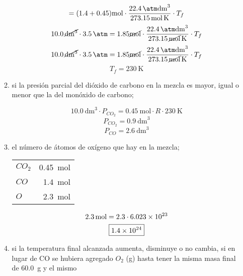 \documentclass[../Práctica.root.tex]{subfiles}
\begin{document}
\begin{enumerate}
\begin{enumerate}
\begin{center}
\[                            = (\num{1,4} + \num{0,45})\si{\mole}
                            \cdot\frac{\SI{22,4}{\atm\dm\cubed}}{\SI{273,15}{\mole\kelvin}}
                            \cdot T_f
                        \]
                        \[
                            \SI{10,0}{\cancel\dm\cubed}\cdot\SI{3,5}{\cancel\atm}
                            = \num{1,85}\si{\cancel\mole}
                            \cdot\frac{\SI{22,4}{\cancel\atm\cancel\dm\cubed}}{\SI{273,15}{\cancel\mole\kelvin}}
                            \cdot T_f
                        \]
                        \[
                            \SI{10,0}{\cancel\dm\cubed}\cdot\SI{3,5}{\cancel\atm}
                            = \num{1,85}\si{\cancel\mole}
                            \cdot\frac{\SI{22,4}{\cancel\atm\cancel\dm\cubed}}{\SI{273,15}{\cancel\mole\kelvin}}
                            \cdot T_f
                        \]
                        \[ \boxed{T_f = \SI{230}{\kelvin}} \]
                    \end{center}
              \item si la presión parcial del dióxido de carbono en la mezcla es mayor, igual o menor que
                    la del monóxido de carbono;
                    \begin{center}
                        \[ \SI{10,0}{\dm\cubed}\cdot P_{CO_2} = \SI{0,45}{\mole}\cdot R\cdot\SI{230}{\kelvin} \]
                        \[ P_{CO_2} = \SI{0,9}{\dm\cubed} \]
                        \[ P_{CO} = \SI{2,6}{\dm\cubed} \]
                    \end{center}
              \item el número de átomos de oxígeno que hay en la mezcla;
                    \begin{center}
                        \begin{tabular}{ l r }
                            $CO_2$ & \SI{0,45}{\mole} \\
                            $CO$   & \SI{1,4}{\mole}  \\
                            $O$    & \SI{2,3}{\mole}
                        \end{tabular}
                        \[ \SI{2,3}{\mole} = \num{2,3}\cdot\num{6,023E23} \]
                        \[ \boxed{\num{1,4E24}} \]
                    \end{center}
              \item si la temperatura final alcanzada aumenta, disminuye o no cambia, si en lugar de CO
                    se hubiera agregado $O_2$ (g) hasta tener la misma masa final de \SI{60,0}{\gram} y el mismo

\end{enumerate}
\end{enumerate}
\end{document}
